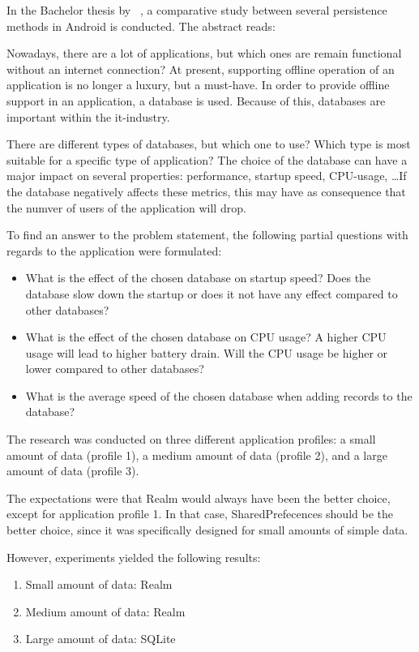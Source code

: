 In the Bachelor thesis by ~\textcite{Akin2016}, a comparative study between several persistence methods in Android is conducted. The abstract reads:

\begin{displayquote}
  Nowadays, there are a lot of applications, but which ones are remain functional without an internet connection? At present, supporting offline operation of an application is no longer a luxury, but a must-have. In order to provide offline support in an application, a database is used. Because of this, databases are important within the it-industry.
  
  There are different types of databases, but which one to use? Which type is most suitable for a specific type of application? The choice of the database can have a major impact on several properties: performance, startup speed, CPU-usage, \ldots If the database negatively affects these metrics, this may have as consequence that the numver of users of the application will drop.
  
  To find an answer to the problem statement, the following partial questions with regards to the application were formulated:
  
  \begin{itemize}
    \item What is the effect of the chosen database on startup speed? Does the database slow down the startup or does it not have any effect compared to other databases?
    \item What is the effect of the chosen database on CPU usage? A higher CPU usage will lead to higher battery drain. Will the CPU usage be higher or lower compared to other databases?
    \item What is the average speed of the chosen database when adding records to the database?
  \end{itemize}
  
  The research was conducted on three different application profiles: a small amount of data (profile 1), a medium amount of data (profile 2), and a large amount of data (profile 3).
  
  The expectations were that Realm would always have been the better choice, except for application profile 1. In that case, SharedPrefecences should be the better choice, since it was specifically designed for small amounts of simple data.
  
  However, experiments yielded the following results:
  
  \begin{enumerate}
    \item Small amount of data: Realm
    \item Medium amount of data: Realm
    \item Large amount of data: SQLite
  \end{enumerate}

\end{displayquote}

